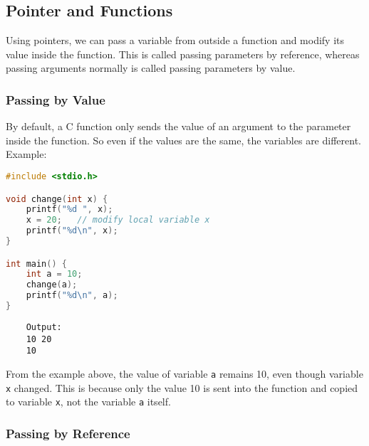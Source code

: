 \subsection{Pointer and Functions}

Using pointers, we can pass a variable from outside a function and modify its value inside the function.
This is called passing parameters by reference, whereas passing arguments normally is called passing parameters by value.

\subsubsection{Passing by Value}

By default, a C function only sends the value of an argument to the parameter inside the function.
So even if the values are the same, the variables are different.
Example:

\begin{lstlisting}[language=c]
#include <stdio.h>

void change(int x) {
	printf("%d ", x);
	x = 20;   // modify local variable x
	printf("%d\n", x);
}

int main() {
	int a = 10;
	change(a);
	printf("%d\n", a);
}
\end{lstlisting}
\begin{verbatim}
	Output:
	10 20
	10
\end{verbatim}
From the example above, the value of variable \texttt{a} remains 10, even though variable \texttt{x} changed.
This is because only the value 10 is sent into the function and copied to variable \texttt{x}, not the variable \texttt{a} itself.

\subsubsection{Passing by Reference}

